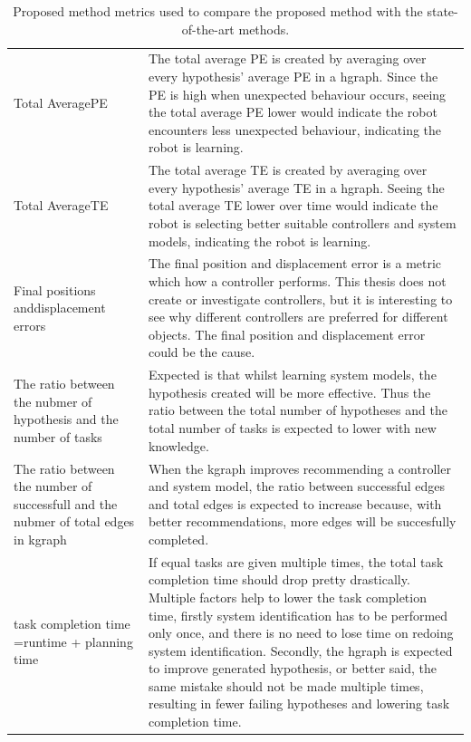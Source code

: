\begin{table}[htb!]
\centering
\begin{tabular}[t]{p{4cm} p{10cm}}
Total Average\newline \acl{PE} & The total average \ac{PE} is created by averaging over every hypothesis' average \ac{PE} in a \ac{hgraph}. Since the \ac{PE} is high when unexpected behaviour occurs, seeing the total average \ac{PE} lower would indicate the robot encounters less unexpected behaviour, indicating the robot is learning.\\
Total Average\newline \acl{TE}& The total average \ac{TE} is created by averaging over every hypothesis' average \ac{TE} in a \ac{hgraph}. Seeing the total average \ac{TE} lower over time would indicate the robot is selecting better suitable controllers and system models, indicating the robot is learning.\\
Final positions and\newline displacement errors & The final position and displacement error is a metric which how a controller performs. This thesis does not create or investigate controllers, but it is interesting to see why different controllers are preferred for different objects. The final position and displacement error could be the cause.\\
The ratio between the nubmer of hypothesis and the number of tasks & Expected is that whilst learning system models, the hypothesis created will be more effective. Thus the ratio between the total number of hypotheses and the total number of tasks is expected to lower with new knowledge.\\
The ratio between the number of successfull and the nubmer of total edges in \ac{kgraph} & When the \ac{kgraph} improves recommending a controller and system model, the ratio between successful edges and total edges is expected to increase because, with better recommendations, more edges will be succesfully completed.\\
task completion time =\newline runtime + planning time& If equal tasks are given multiple times, the total task completion time should drop pretty drastically. Multiple factors help to lower the task completion time, firstly system identification has to be performed only once, and there is no need to lose time on redoing system identification. Secondly, the \ac{hgraph} is expected to improve generated hypothesis, or better said, the same mistake should not be made multiple times, resulting in fewer failing hypotheses and lowering task completion time.\\
\end{tabular}
\caption{Proposed method metrics used to compare the proposed method with the state-of-the-art methods.}\label{table:proposed_method_metrics}
\end{table}

